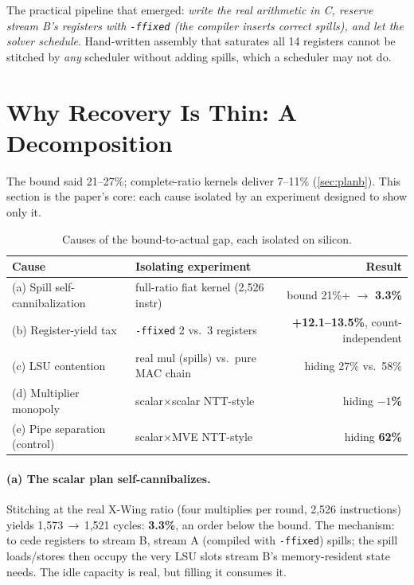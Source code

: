 \documentclass[11pt,a4paper]{article}
\newcommand{\xwing}{X-Wing}\newcommand{\slothy}{SLOTHY}\newcommand{\keccak}{Keccak-f1600}
\begin{document}
The practical pipeline that emerged: \emph{write the real arithmetic in C,
reserve stream B's registers with \texttt{-ffixed} (the compiler inserts
correct spills), and let the solver schedule}. Hand-written assembly that
saturates all 14 registers cannot be stitched by \emph{any} scheduler without
adding spills, which a scheduler may not do.

\section{Why Recovery Is Thin: A Decomposition}\label{sec:causes}

The bound said 21--27\%; complete-ratio kernels deliver 7--11\%
(\cref{sec:planb}). This section is the paper's core: each cause isolated by an
experiment designed to show only it.

\begin{table}[t]\centering
\caption{Causes of the bound-to-actual gap, each isolated on silicon.}
\label{tab:causes}
\begin{tabular}{llr}\toprule
Cause & Isolating experiment & Result\\\midrule
(a) Spill self-cannibalization & full-ratio fiat kernel (2,526 instr) & bound 21\%+ $\to$ \textbf{3.3\%}\\
(b) Register-yield tax & \texttt{-ffixed} 2 vs.\ 3 registers & \textbf{+12.1--13.5\%}, count-independent\\
(c) LSU contention & real mul (spills) vs.\ pure MAC chain & hiding 27\% vs.\ 58\%\\
(d) Multiplier monopoly & scalar$\times$scalar NTT-style & hiding \textbf{$-1$\%}\\
(e) Pipe separation (control) & scalar$\times$MVE NTT-style & hiding \textbf{62\%}\\\bottomrule
\end{tabular}\end{table}

\paragraph{(a) The scalar plan self-cannibalizes.} Stitching at the real
\xwing{} ratio (four multiplies per round, 2,526 instructions) yields
1,573$\,\to\,$1,521 cycles: \textbf{3.3\%}, an order below the bound. The
mechanism: to cede registers to stream B, stream A (compiled with
\texttt{-ffixed}) spills; the spill loads/stores then occupy the very LSU slots
stream B's memory-resident state needs. The idle capacity is real, but filling
it consumes it.
\end{document}
